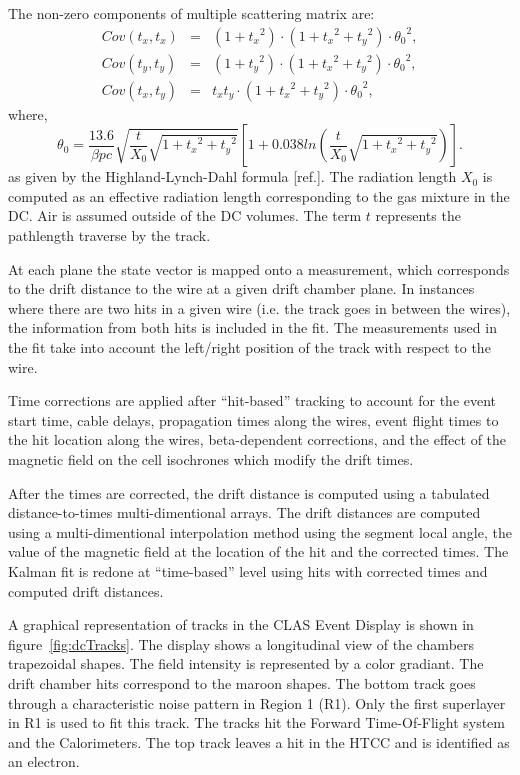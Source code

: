 \documentclass[3p,times,twocolumn]{elsarticle}
\begin{document}
The non-zero components of multiple scattering matrix are:
\begin{equation*}
\begin{aligned}
Cov (t_{x} , t_{x}) &=& (1+{t_x}^{2} )\cdot (1+{t_x}^{2} + {t_y}^2 )\cdot {\theta_{0}}^{2} , \\
Cov (t_{y} , t_{y}) &=& (1+{t_y}^{2} )\cdot (1+{t_x}^{2} + {t_y}^2 )\cdot {\theta_{0}}^{2} , \\
Cov (t_{x} , t_{y}) &=&  t_{x} t_{y}\cdot (1+{t_x}^{2} + {t_y}^2 )\cdot {\theta_{0}}^{2} ,
\end{aligned}
\end{equation*}
where,
\begin{equation}
{\theta_{0}} = \frac{13.6}{\beta pc}\sqrt{\frac{t}{X_{0}}\sqrt{1+{t_x}^2+{t_y}^2}}\left[ {1+0.038 ln \left({\frac{t}{X_{0}}\sqrt{1+{t_x}^2+{t_y}^2}}\right) }\right].
\end{equation}
as given by the Highland-Lynch-Dahl formula [ref.].
The radiation length $X_0$ is computed as an effective radiation length corresponding to the gas mixture in the DC.
Air is assumed outside of the DC volumes. The term $t$ represents the pathlength traverse by the track.

At each plane the state vector is mapped onto a measurement, which corresponds to the drift distance to the
wire at a given drift chamber plane.  In instances where there are two hits in a given wire (i.e. the track
goes in between the wires), the information from both hits is included in the fit.
The measurements used in the fit
take into account the left/right position of the track with respect to the wire.

Time corrections are applied
after ``hit-based'' tracking to account for the event start time, cable delays, propagation times along the
wires, event flight times to the hit location along the wires, beta-dependent corrections, and the effect of
the magnetic field on the cell isochrones which modify the drift times.

After the times are corrected, the drift distance is computed using a tabulated distance-to-times
multi-dimentional arrays.  The drift distances are computed using a multi-dimentional interpolation method
using the segment local angle, the value of the magnetic field at the location of the hit and the corrected
times.  The Kalman fit is redone at ``time-based'' level using hits with corrected times and computed drift
distances.

A graphical representation of tracks in the CLAS Event Display is shown in figure~\ref{fig:dcTracks}.  The
display shows a longitudinal view of the chambers trapezoidal shapes. The field intensity is represented by a
color gradiant. The drift chamber hits correspond to the maroon shapes.  The bottom track goes through a
characteristic noise pattern in Region 1 (R1). Only the first superlayer in R1 is used to fit this track.  The
tracks hit the Forward Time-Of-Flight system and the Calorimeters.  The top track leaves a hit in the HTCC
and is identified as an electron.
\end{document}

